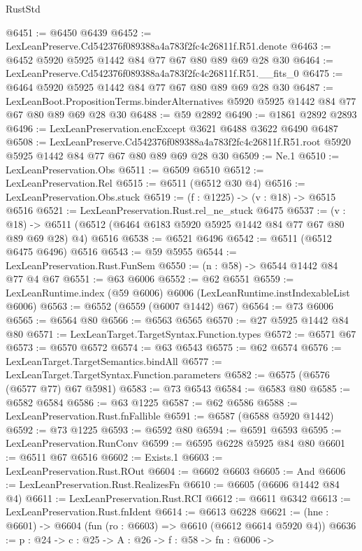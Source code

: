 \begin{lexlean}{RustStd}
\begin{coremodule}
@6451 := @6450 @6439
@6452 := LexLeanPreserve.Cd542376f089388a4a783f2fc4c26811f.R51.denote
@6463 := @6452 @5920 @5925 @1442 @84 @77 @67 @80 @89 @69 @28 @30
@6464 := LexLeanPreserve.Cd542376f089388a4a783f2fc4c26811f.R51.__fits_0
@6475 := @6464 @5920 @5925 @1442 @84 @77 @67 @80 @89 @69 @28 @30
@6487 := LexLeanBoot.PropositionTerms.binderAlternatives
    @5920
    @5925
    @1442
    @84
    @77
    @67
    @80
    @89
    @69
    @28
    @30
@6488 := @59 @2892
@6490 := @1861 @2892 @2893
@6496 := LexLeanPreservation.encExcept @3621 @6488 @3622 @6490 @6487
@6508 := LexLeanPreserve.Cd542376f089388a4a783f2fc4c26811f.R51.root
    @5920
    @5925
    @1442
    @84
    @77
    @67
    @80
    @89
    @69
    @28
    @30
@6509 := Ne.{1}
@6510 := LexLeanPreservation.Obs
@6511 := @6509 @6510
@6512 := LexLeanPreservation.Rel
@6515 := @6511 (@6512 @30 @4)
@6516 := LexLeanPreservation.Obs.stuck
@6519 := (f : @1225) -> (v : @18) -> @6515 @6516
@6521 := LexLeanPreservation.Rust.rel_ne_stuck @6475
@6537 := (v : @18) ->
  @6511 (@6512 (@6464 @6183 @5920 @5925 @1442 @84 @77 @67 @80 @89 @69 @28) @4) @6516
@6538 := @6521 @6496
@6542 := @6511 (@6512 @6475 @6496) @6516
@6543 := @59 @5955
@6544 := LexLeanPreservation.Rust.FunSem
@6550 := (n : @58) -> @6544 @1442 @84 @77 @4 @67
@6551 := @63 @6006
@6552 := @62 @6551
@6559 := LexLeanRuntime.index (@59 @6006) @6006 (LexLeanRuntime.instIndexableList @6006)
@6563 := @6552 (@6559 (@6007 @1442) @67)
@6564 := @73 @6006
@6565 := @6564 @80
@6566 := @6563 @6565
@6570 := @27 @5925 @1442 @84 @80
@6571 := LexLeanTarget.TargetSyntax.Function.types
@6572 := @6571 @67
@6573 := @6570 @6572
@6574 := @63 @6543
@6575 := @62 @6574
@6576 := LexLeanTarget.TargetSemantics.bindAll
@6577 := LexLeanTarget.TargetSyntax.Function.parameters
@6582 := @6575 (@6576 (@6577 @77) @67 @5981)
@6583 := @73 @6543
@6584 := @6583 @80
@6585 := @6582 @6584
@6586 := @63 @1225
@6587 := @62 @6586
@6588 := LexLeanPreservation.Rust.fnFallible
@6591 := @6587 (@6588 @5920 @1442)
@6592 := @73 @1225
@6593 := @6592 @80
@6594 := @6591 @6593
@6595 := LexLeanPreservation.RunConv
@6599 := @6595 @6228 @5925 @84 @80
@6601 := @6511 @67 @6516
@6602 := Exists.{1}
@6603 := LexLeanPreservation.Rust.ROut
@6604 := @6602 @6603
@6605 := And
@6606 := LexLeanPreservation.Rust.RealizesFn
@6610 := @6605 (@6606 @1442 @84 @4)
@6611 := LexLeanPreservation.Rust.RCI
@6612 := @6611 @6342
@6613 := LexLeanPreservation.Rust.fnIdent
@6614 := @6613 @6228
@6621 := (hne : @6601) -> @6604 (fun (ro : @6603) => @6610 (@6612 @6614 @5920 @4))
@6636 := {p : @24} ->
  {c : @25} ->
  {A : @26} ->
  {f : @58} ->
  {fn : @6006} ->

\end{coremodule}
\end{lexlean}
